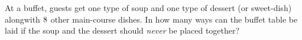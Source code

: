 
%
%
%
%      
% 
% 
%   



\gcalcexpr[0]
\gcalcexpr[0]
\gcalcexpr[0]

\question At a buffet, guests get one type of soup and one type of dessert (or sweet-dish) alongwith $8$ other 
main-course dishes. In how many ways can the buffet table be laid if the soup and the dessert should \textit{never} be
placed together? 

